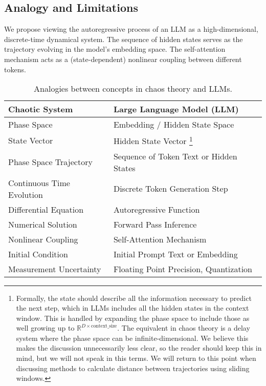 \documentclass[a4paper,12pt]{article}
\begin{document}
\subsection{Analogy and Limitations}
\label{subsec:analogy_limitations}
We propose viewing the autoregressive process of an LLM as a high-dimensional, discrete-time dynamical system. The sequence of hidden states serves as the trajectory evolving in the model's embedding space. The self-attention mechanism acts as a (state-dependent) nonlinear coupling between different tokens. 

\begin{table}[H]
\centering
\begin{tabular}{@{}ll@{}}
\toprule
\textbf{Chaotic System} & \textbf{Large Language Model (LLM)} \\ \midrule
Phase Space & Embedding / Hidden State Space \\
State Vector & Hidden State Vector \footnote{Formally, the state should describe all the information necessary to predict the next step, which in LLMs includes all the hidden states in the context window. This is handled by expanding the phase space to include those as well growing up to $\mathbb{R}^{D \times \text{context\_size}}$. The equivalent in chaos theory is a delay system where the phase space can be infinite-dimensional. We believe this makes the discussion unnecessarily less clear, so the reader should keep this in mind, but we will not speak in this terms. We will return to this point when discussing methods to calculate distance between trajectories using sliding windows.} \\ %
Phase Space Trajectory & Sequence of Token Text or Hidden States \\
Continuous Time Evolution & Discrete Token Generation Step \\
Differential Equation & Autoregressive Function \\
Numerical Solution & Forward Pass Inference \\
Nonlinear Coupling & Self-Attention Mechanism \\
Initial Condition & Initial Prompt Text or Embedding \\
Measurement Uncertainty & Floating Point Precision, Quantization \\ \bottomrule
\end{tabular}
\caption{Analogies between concepts in chaos theory and LLMs.}
\label{tab:analogy}
\end{table}
\end{document}
